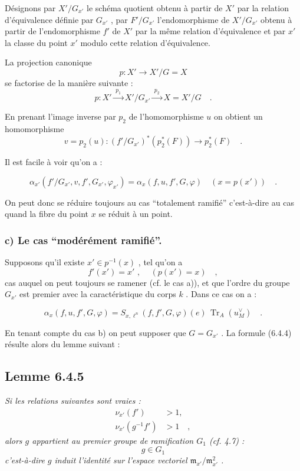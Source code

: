 \documentclass[11pt]{article}
\providecommand{\fm}{\mathfrak{m}}
\providecommand{\Tr}{\operatorname{Tr}}
\providecommand{\Tr}{\operatorname{Tr}}
\providecommand{\Tr}{\operatorname{Tr}}
\providecommand{\Tr}{\operatorname{Tr}}
\providecommand{\fm}{\mathfrak m}
\providecommand{\Tr}{\operatorname{Tr}}
\begin{document}
Désignons par $X'/G_{x'}$ le schéma quotient obtenu à partir de $X'$ par la relation d'équivalence définie par $G_{x'}$ , par $F'/G_{x'}$ l'endomorphisme de $X'/G_{x'}$ obtenu à partir de l'endomorphisme $f'$ de $X'$ par la même relation d'équivalence et par $x'$ la classe du point $x'$ modulo cette relation d'équivalence.%

La projection canonique
\[
p : X' \longrightarrow X'/G = X
\]
se factorise de la manière suivante :
\[
p : X' \xrightarrow{\;p_1\;} X'/G_{x'} \xrightarrow{\;p_2\;} X = X'/G \quad .
\]

En prenant l'image inverse par $p_2$ de l'homomorphisme $u$ on obtient un homomorphisme
\[
v = p_2(u) : (f'/G_{x'})^*(p_2^*(F)) \longrightarrow p_2^*(F) \quad .
\]

Il est facile à voir qu'on a :

\begin{equation}\tag{6.4.3}
\alpha_{x'}(f'/G_{x'}, v, f', G_{x'}, \varphi_{x'}) = \alpha_x(f,u, f', G, \varphi) \quad (x = p(x')) \quad .
\end{equation}

On peut donc se réduire toujours au cas ``totalement ramifié'' c'est-à-dire au cas quand la fibre du point $x$ se réduit à un point.

\subsubsection*{c) Le cas ``modérément ramifié''.} Supposons qu'il existe $x' \in p^{-1}(x)$ , tel qu'on a
\[
f'(x') = x' \text{ , } \quad (p(x') = x) \quad ,
\]
cas auquel on peut toujours se ramener (cf. le cas a)), et que l'ordre du groupe $G_{x'}$ est premier avec la caractéristique du corps $k$ . Dans ce cas on a :

\begin{equation}\tag{6.4.4}
\alpha_x(f,u, f', G, \varphi) = S_{x,\ell^n}(f, f', G, \varphi)(e) \, \Tr_A(u_M^\vee) \quad .
\end{equation}

En tenant compte du cas b) on peut supposer que $G = G_{x'}$ . La formule (6.4.4) résulte alors du lemme suivant :

\subsection*{Lemme 6.4.5}
\emph{Si les relations suivantes sont vraies :}
\begin{align*}
\nu_{x'}(f') &> 1 \text{,} \\
\nu_{x'}(g^{-1}f') &> 1 \quad ,
\end{align*}
\emph{alors $g$ appartient au premier groupe de ramification $G_1$ (cf. 4.7) :}
\[
g \in G_1
\]
\emph{c'est-à-dire $g$ induit l'identité sur l'espace vectoriel $\fm_{x'}/\fm_{x'}^2$ .}
\end{document}
